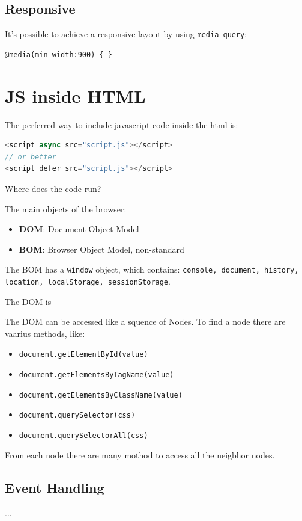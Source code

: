 \documentclass[12pt]{article}
\begin{document}
\subsection{Responsive}
It's possible to achieve a responsive layout by using \texttt{media query}:
\begin{lstlisting}[language=html]
@media(min-width:900) { }
\end{lstlisting}


\section{JS inside HTML}
The perferred way to include javascript code inside the html is:
\begin{lstlisting}[language=js]
<script async src="script.js"></script>
// or better
<script defer src="script.js"></script>
\end{lstlisting}
Where does the code run?


The main objects of the browser:
\begin{itemize}
  \item \textbf{DOM}: Document Object Model 
  \item \textbf{BOM}: Browser Object Model, non-standard
\end{itemize}
The BOM has a \texttt{window} object, which contains: \texttt{console, document, history, location, localStorage, sessionStorage}.

The DOM is 

The DOM can be accessed like a squence of Nodes. To find a node there are vaarius methods, like:
\begin{itemize}
  \item \texttt{document.getElementById(value)}
  \item \texttt{document.getElementsByTagName(value)}
  \item \texttt{document.getElementsByClassName(value)}
  \item \texttt{document.querySelector(css)}
  \item \texttt{document.querySelectorAll(css)}
\end{itemize}
From each node there are many mothod to access all the neigbhor nodes.




\subsection{Event Handling}
...
\end{document}
